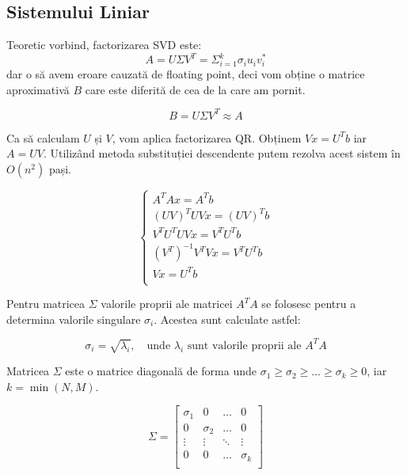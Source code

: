 \documentclass[12pt]{article}
\begin{document}
\subsection{Sistemului Liniar}\label{Modelul}

Teoretic vorbind, factorizarea SVD este:
\begin{equation}
    A = U \Sigma V^T = \Sigma_{i=1}^{k}\sigma_{i}u_{i}v_{i}^{*}
\end{equation}
 dar o să avem eroare cauzată de floating point, deci vom obține o matrice aproximativă $B$ care este diferită de cea de la care am pornit.

\begin{equation}
    B = U \Sigma V^T \approx A
\end{equation}

Ca să calculam $U$ și $V$, vom aplica factorizarea QR. Obținem $Vx=U^{T}b$ iar $A=UV$. Utilizând metoda substituției descendente putem rezolva acest sistem în $O(n^2)$ pași.

\begin{equation}
    \begin{cases}
        A^{T}Ax=A^{T}b\\[2pt]
        (UV)^{T}UVx=(UV)^{T}b\\[2pt]
        V^{T}U^{T}UVx=V^{T}U^{T}b\\[2pt]
        (V^{T})^{-1}V^{T}Vx=V^{T}U^{T}b\\[2pt]
        Vx=U^{T}b\\[2pt]
        
    \end{cases}
\end{equation}

Pentru matricea $\Sigma$ valorile proprii ale matricei $A^TA$ se folosesc pentru a determina valorile singulare $\sigma_i$. Acestea sunt calculate astfel:

\begin{equation}
\sigma_i = \sqrt{\lambda_i}, \quad \text{unde } \lambda_i \text{ sunt valorile proprii ale } A^TA
\end{equation}

Matricea $\Sigma$ este o matrice diagonală de forma unde $\sigma_1 \geq \sigma_2 \geq \dots \geq \sigma_k \geq 0$, iar $k = \min(N, M)$.

\begin{equation}
\Sigma = \begin{bmatrix}
\sigma_1 & 0 & \dots & 0 \\
0 & \sigma_2 & \dots & 0 \\
\vdots & \vdots & \ddots & \vdots \\
0 & 0 & \dots & \sigma_k \\
\end{bmatrix}
\end{equation}
\end{document}

